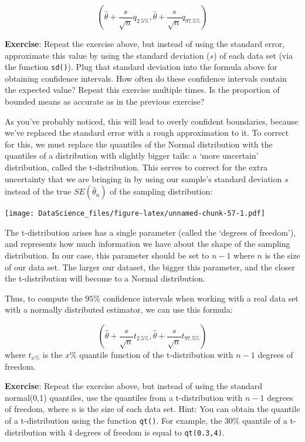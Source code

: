 \documentclass[
]{book}
\begin{document}
\[(\hat{\theta} + \frac{s}{\sqrt{n}}q_{2.5\%}, \hat{\theta} + \frac{s}{\sqrt{n}}q_{97.5\%})\]

\textbf{Exercise}: Repeat the exercise above, but instead of using the standard error, approximate this value by using the standard deviation (\(s\)) of each data set (via the function \texttt{sd()}). Plug that standard deviation into the formula above for obtaining confidence intervals. How often do these confidence intervals contain the expected value? Repeat this exercise multiple times. Is the proportion of bounded means as accurate as in the previous exercise?

As you've probably noticed, this will lead to overly confident boundaries, because we've replaced the standard error with a rough approximation to it. To correct for this, we must replace the quantiles of the Normal distribution with the quantiles of a distribution with slightly bigger tails: a `more uncertain' distribution, called the t-distribution. This serves to correct for the extra uncertainty that we are bringing in by using our sample's standard deviation \(s\) instead of the true \(SE(\hat{\theta}_n)\) of the sampling distribution:

\texttt{[image: DataScience\_files/figure-latex/unnamed-chunk-57-1.pdf]}

The t-distribution arises has a single parameter (called the `degrees of freedom'), and represents how much information we have about the shape of the sampling distribution. In our case, this parameter should be set to \(n-1\) where \(n\) is the size of our data set. The larger our dataset, the bigger this parameter, and the closer the t-distribution will become to a Normal distribution.

Thus, to compute the \(95\%\) confidence intervals when working with a real data set with a normally distributed estimator, we can use this formula:

\[(\hat{\theta} + \frac{s}{\sqrt{n}}t_{2.5\%}, \hat{\theta} + \frac{s}{\sqrt{n}}t_{97.5\%})\]
where \(t_{x\%}\) is the \(x\%\) quantile function of the t-distribution with \(n-1\) degrees of freedom.

\textbf{Exercise}: Repeat the exercise above, but instead of using the standard normal(0,1) quantiles, use the quantiles from a t-distribution with \(n-1\) degrees of freedom, where \(n\) is the size of each data set. Hint: You can obtain the quantile of a t-distribution using the function \texttt{qt()}. For example, the \(30\%\) quantile of a t-distribution with 4 degrees of freedom is equal to \texttt{qt(0.3,4)}.
\end{document}
